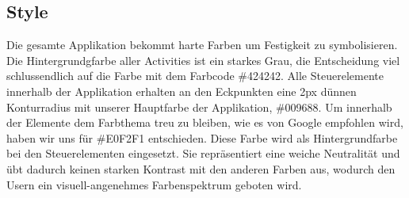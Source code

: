\documentclass[FIPLY_base.tex]{subfiles}
\begin{document}
\subsection{Style}
Die gesamte Applikation bekommt harte Farben um Festigkeit zu symbolisieren. Die Hintergrundgfarbe aller Activities ist ein starkes Grau, die Entscheidung viel schlussendlich auf die Farbe mit dem Farbcode \#424242. Alle Steuerelemente innerhalb der Applikation erhalten an den Eckpunkten eine 2px dünnen Konturradius mit unserer Hauptfarbe der Applikation, \#009688. Um innerhalb der Elemente dem Farbthema treu zu bleiben, wie es von Google empfohlen wird, haben wir uns für \#E0F2F1 entschieden. Diese Farbe wird als Hintergrundfarbe bei den Steuerelementen eingesetzt. Sie repräsentiert eine weiche Neutralität und übt dadurch keinen starken Kontrast mit den anderen Farben aus, wodurch den Usern ein visuell-angenehmes Farbenspektrum geboten wird. 
\end{document}
